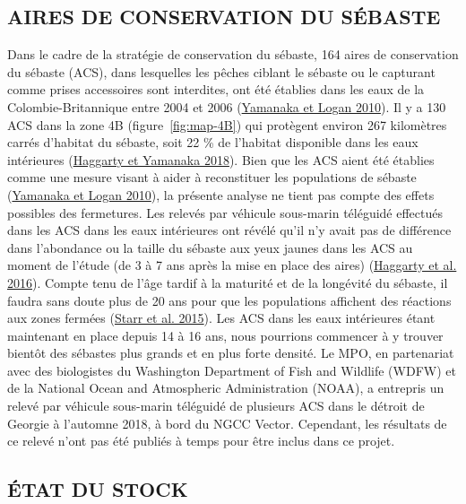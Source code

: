 \documentclass[french,11pt]{book}
\begin{document}
\hypertarget{sec:discussion-rca}{%
\subsection{AIRES DE CONSERVATION DU SÉBASTE}\label{sec:discussion-rca}}

Dans le cadre de la stratégie de conservation du sébaste, 164 aires de conservation du sébaste (ACS), dans lesquelles les pêches ciblant le sébaste ou le capturant comme prises accessoires sont interdites, ont été établies dans les eaux de la Colombie-Britannique entre 2004 et 2006 (\protect\hyperlink{ref-yamanaka2010}{Yamanaka et Logan 2010}). Il y a 130 ACS dans la zone 4B (figure~\ref{fig:map-4B}) qui protègent environ 267 kilomètres carrés d'habitat du sébaste, soit 22 \% de l'habitat disponible dans les eaux intérieures (\protect\hyperlink{ref-haggarty2018}{Haggarty et Yamanaka 2018}). Bien que les ACS aient été établies comme une mesure visant à aider à reconstituer les populations de sébaste (\protect\hyperlink{ref-yamanaka2010}{Yamanaka et Logan 2010}), la présente analyse ne tient pas compte des effets possibles des fermetures. Les relevés par véhicule sous-marin téléguidé effectués dans les ACS dans les eaux intérieures ont révélé qu'il n'y avait pas de différence dans l'abondance ou la taille du sébaste aux yeux jaunes dans les ACS au moment de l'étude (de 3 à 7 ans après la mise en place des aires) (\protect\hyperlink{ref-haggarty2016b}{Haggarty et al. 2016}). Compte tenu de l'âge tardif à la maturité et de la longévité du sébaste, il faudra sans doute plus de 20 ans pour que les populations affichent des réactions aux zones fermées (\protect\hyperlink{ref-starr2015}{Starr et al. 2015}). Les ACS dans les eaux intérieures étant maintenant en place depuis 14 à 16 ans, nous pourrions commencer à y trouver bientôt des sébastes plus grands et en plus forte densité. Le MPO, en partenariat avec des biologistes du Washington Department of Fish and Wildlife (WDFW) et de la National Ocean and Atmospheric Administration (NOAA), a entrepris un relevé par véhicule sous-marin téléguidé de plusieurs ACS dans le détroit de Georgie à l'automne 2018, à bord du NGCC Vector. Cependant, les résultats de ce relevé n'ont pas été publiés à temps pour être inclus dans ce projet.

\hypertarget{sec:discussion-status}{%
\subsection{ÉTAT DU STOCK}\label{sec:discussion-status}}
\end{document}
